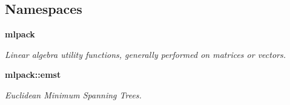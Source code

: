 \subsection*{Namespaces}
\begin{DoxyCompactItemize}
\item 
 {\bf mlpack}
\begin{DoxyCompactList}\small\item\em Linear algebra utility functions, generally performed on matrices or vectors. \end{DoxyCompactList}\item 
 {\bf mlpack\+::emst}
\begin{DoxyCompactList}\small\item\em Euclidean Minimum Spanning Trees. \end{DoxyCompactList}\end{DoxyCompactItemize}

